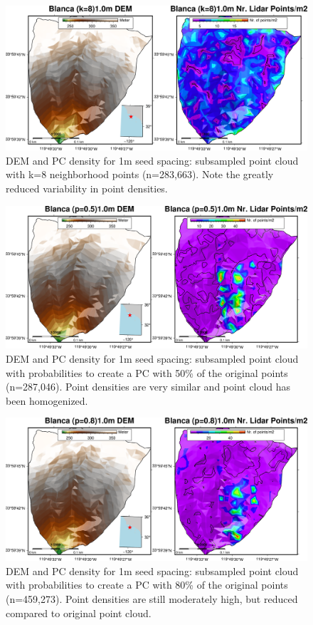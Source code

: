 \documentclass[a4paperpaper,,tablecaptionabove]{scrartcl}
\begin{document}
\begin{figure}
\centering
\includegraphics{./tex2pdf.-e6884bf2dada0f3b/2da20a42061ee58b434f36b93fa8ff9fcc3820fc.png}
\caption{DEM and PC density for 1m seed spacing: subsampled point cloud
with k=8 neighborhood points (n=283,663). Note the greatly reduced
variability in point densities.\label{Fig:k8_DEM_PC_density_1m}}
\end{figure}

\begin{figure}
\centering
\includegraphics{./tex2pdf.-e6884bf2dada0f3b/00f3f8e4bd4593dbdb584d411f22b27b2ae807ac.png}
\caption{DEM and PC density for 1m seed spacing: subsampled point cloud
with probabilities to create a PC with 50\% of the original points
(n=287,046). Point densities are very similar and point cloud has been
homogenized.\label{Fig:p05_DEM_PC_density_1m}}
\end{figure}

\begin{figure}
\centering
\includegraphics{./tex2pdf.-e6884bf2dada0f3b/d7352146bc0009aee49cbeea9508617082833b03.png}
\caption{DEM and PC density for 1m seed spacing: subsampled point cloud
with probabilities to create a PC with 80\% of the original points
(n=459,273). Point densities are still moderately high, but reduced
compared to original point cloud.\label{Fig:p08_DEM_PC_density_1m}}
\end{figure}
\end{document}
